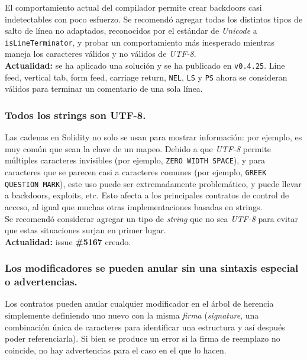 El comportamiento actual del compilador permite crear backdoors casi indetectables con poco esfuerzo. Se recomendó agregar todas los distintos tipos de salto de línea no adaptados, reconocidos por el estándar de \textit{Unicode}\cite{UnicodeLineBreaking} a \verb|isLineTerminator|, y probar un comportamiento más inesperado mientras maneja los caracteres válidos y no válidos de \textit{UTF-8}.\\

\textbf{Actualidad:} se ha aplicado una solución\cite{GHPR4937} y se ha publicado en \verb|v0.4.25|. Line feed, vertical tab, form feed, carriage return, \texttt{NEL}, \texttt{LS} y \texttt{PS} ahora se consideran válidos para terminar un comentario de una sola línea.\\


\subsubsection{Todos los strings son UTF-8.}
Las cadenas en Solidity no solo se usan para mostrar información: por ejemplo, es muy común que sean la clave de un mapeo. Debido a que \textit{UTF-8} permite múltiples caracteres invisibles (por ejemplo, \texttt{ZERO WIDTH SPACE}\cite{UnicodeZeroWidth}), y para caracteres que se parecen casi a caracteres comunes (por ejemplo, \texttt{GREEK QUESTION MARK}\cite{UnicodeGreekQuestion}), este uso puede ser extremadamente problemático, y puede llevar a backdoors, exploits, etc. Esto afecta a los principales contratos de control de acceso\cite{OpenZeppelinGHRBAC}, al igual que muchas otras implementaciones basadas en strings.\\

Se recomendó considerar agregar un tipo de \textit{string} que no sea \textit{UTF-8} para evitar que estas situaciones surjan en primer lugar.\\

\textbf{Actualidad:} issue \textbf{\#5167}\cite{GHI5167} creado.\\

\subsubsection{Los modificadores se pueden anular sin una sintaxis especial o advertencias.}

Los contratos pueden anular cualquier modificador en el árbol de herencia simplemente definiendo uno nuevo con la misma \textit{firma} (\textit{signature}, una combinación única de caracteres para identificar una estructura y así después poder referenciarla). Si bien se produce un error si la firma de reemplazo no coincide, no hay advertencias para el caso en el que lo hacen.

